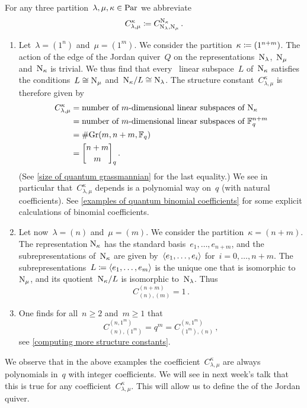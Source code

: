 \documentclass[a4paper,11pt]{scrartcl}
\begin{document}
\begin{example}
  For any three partition~$\lambda, \mu, \kappa \in \mathrm{Par}$ we abbreviate
  \[
    C^{\kappa}_{\lambda, \mu}
    \coloneqq
    C^{\mathrm{N}_{\kappa}}_{\mathrm{N}_{\lambda}, \mathrm{N}_{\mu}} \,.
  \]
  \begin{enumerate}
    \item
      Let~$\lambda = (1^n)$ and~$\mu = (1^m)$.
      We consider the partition~$\kappa \coloneqq (1^{n+m})$.
      The action of the edge of the Jordan quiver~$Q$ on the representations~$\mathrm{N}_\lambda$,~$\mathrm{N}_\mu$ and~$\mathrm{N}_\kappa$ is trivial.
      We thus find that every~ linear subspace~$L$ of~$\mathrm{N}_{\kappa}$ satisfies the conditions~$L \cong \mathrm{N}_\mu$ and~$\mathrm{N}_\kappa / L \cong \mathrm{N}_\lambda$.
      The structure constant~$C^{\kappa}_{\lambda, \mu}$ is therefore given by
      \begin{align*}
        C^{\kappa}_{\lambda, \mu}
        &=
        \text{number of~\dimensional{$m$} linear subspaces of~$\Nil_{\kappa}$}
        \\
        &=
        \text{number of~\dimensional{$m$} linear subspaces of~$\Finite_q^{n+m}$}
        \\
        &=
        \counting {\Gr(m, n+m, \Finite_q)}
        \\
        &=
        \qbinom{n+m}{m}_q \,.
      \end{align*}
      (See \cref{size of quantum grassmannian} for the last equality.)
      We see in particular that~$C^{\kappa}_{\lambda, \mu}$ depends is a polynomial way on~$q$ (with natural coefficients). 
      See \cref{examples of quantum binomial coefficients} for some explicit calculations of binomial coefficients.
    \item
      Let now~$\lambda = (n)$ and~$\mu = (m)$.
      We consider the partition~$\kappa = (n+m)$. 
      The representation$~\mathrm{N}_{\kappa}$ has the standard basis~$e_1, \dotsc, e_{n+m}$, and the subrepresentations of~$\mathrm{N}_{\kappa}$ are given by~$\langle e_1, \dotsc, e_i\rangle$ for~$i = 0, \dotsc, n+m$.
      The subrepresentations~$L \coloneqq \langle e_1, \dotsc, e_m\rangle$ is the unique one that is isomorphic to~$\mathrm{N}_\mu$, and its quotient~$\mathrm{N}_\kappa / L$ is isomorphic to~$\mathrm{N}_\lambda$.
      Thus
      \[
        C^{(n+m)}_{(n),(m)}
        =
        1 \,.
      \]
    \item
      One finds for all~$n \geq 2$ and~$m \geq 1$ that
      \[
        C^{(n, 1^m)}_{(n), (1^m)}
        =
        q^m
        =
        C^{(n, 1^m)}_{(1^m), (n)} \,,
      \]
      see \cref{computing more structure constants}.
  \end{enumerate}
  We observe that in the above examples the coefficient~$C^{\kappa}_{\lambda, \mu}$ are always polynomials in~$q$ with integer coefficients.
  We will see in next week’s talk that this is true for any coefficient~$C^{\kappa}_{\lambda, \mu}$.
  This will allow us to define the  of the Jordan quiver.


\end{example}
\end{document}
